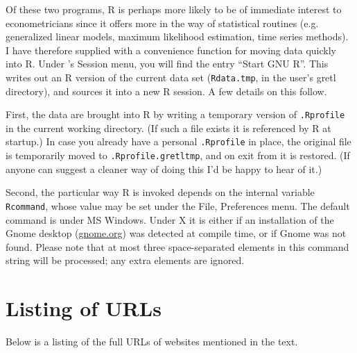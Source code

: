 Of these two programs, R is perhaps more likely to be of immediate
interest to econometricians since it offers more in the way of
statistical routines (e.g. generalized linear models, maximum
likelihood estimation, time series methods). I have therefore supplied
 with a convenience function for moving data quickly into
R. Under 's Session menu, you will find the entry ``Start
GNU R''.  This writes out an R version of the current  data
set (\verb+Rdata.tmp+, in the user's gretl directory), and sources it
into a new R session. A few details on this follow.
  
First, the data are brought into R by writing a temporary version of
\verb+.Rprofile+ in the current working directory.  (If such a file
exists it is referenced by R at startup.)  In case you already have a
personal \verb+.Rprofile+ in place, the original file is temporarily
moved to \verb+.Rprofile.gretltmp+, and on exit from  it is
restored.  (If anyone can suggest a cleaner way of doing this I'd be
happy to hear of it.)
  
Second, the particular way R is invoked depends on the internal
 variable \verb+Rcommand+, whose value may be set under the
File, Preferences menu.  The default command is  under
MS Windows. Under X it is either  if an
installation of the Gnome desktop
(\href{http://www.gnome.org/}{gnome.org}) was detected at compile
time, or  if Gnome was not found. Please note that at
most three space-separated elements in this command string will be
processed; any extra elements are ignored.

\chapter{Listing of URLs}
\label{app-urls}

Below is a listing of the full URLs of websites mentioned in the text.

